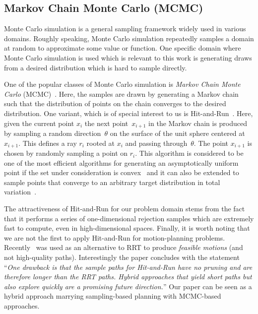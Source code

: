 \documentclass[letterpaper, 10 pt, conference]{ieeeconf}  %
\begin{document}
\subsection{Markov Chain Monte Carlo (MCMC)}
\label{subsec:mcmc}
Monte Carlo simulation is a general sampling framework widely used in various domains. %
Roughly speaking, Monte Carlo simulation repeatedly samples a domain at random to approximate some value or function.
One specific domain where Monte Carlo simulation is used which is relevant to this work is generating draws from a desired distribution which is hard to sample directly.

One of the popular classes of Monte Carlo simulation is 
\emph{Markov Chain Monte Carlo} (MCMC)~\cite{ADDJ03}.
Here, the samples are drawn by generating a Markov chain such that the distribution of points on the chain converges to the desired distribution.
One variant, which is of special interest to us is 
Hit-and-Run~\cite{KSZ11}.
Here, given the current point $x_i$ the next point~$x_{i+1}$ in the Markov chain is produced by sampling a random direction~$\theta$ on the surface of the unit sphere centered at $x_{i+1}$. This defines a ray $r_i$ rooted at $x_i$ and passing through~$\theta$. The point $x_{i+1}$ is chosen by randomly sampling a point on $r_i$.
This algorithm is considered to be one of the most efficient algorithms for generating an asymptotically uniform point if the set under consideration is convex~\cite{LV06}
and it can also be extended to sample points that converge to an arbitrary target distribution in total variation~\cite{RS94}.

The attractiveness of Hit-and-Run for our problem domain stems from the fact that it performs a series of one-dimensional rejection samples which are extremely fast to compute, even in high-dimensional spaces. 
Finally, it is worth noting that we are not the first to apply Hit-and-Run for motion-planning problems.
Recently~\cite{YPVA17} was used as an alternative to RRT to produce \emph{feasible motions} (and not high-quality paths). 
Interestingly the paper concludes with the statement ``\emph{One drawback is that the sample paths for Hit-and-Run have no pruning and are therefore longer than the RRT paths. Hybrid approaches that yield short paths but also explore quickly are a promising future direction.}''
Our paper can be seen as a hybrid approach marrying sampling-based planning with MCMC-based approaches.
\end{document}
